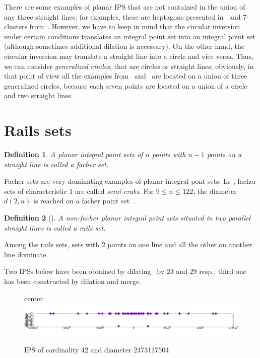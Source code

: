 \documentclass[12pt]{article}
\theoremstyle{theorem}
\theoremstyle{dfn}
\newtheorem{dfn}{Definition}
\theoremstyle{remark}
\begin{document}
There are some examples of planar IPS that are not contained in the union of any three straight lines:
for examples, these are heptagons presented in~\cite{kreisel2008heptagon} and 7-clusters from~\cite{kurz2013constructing}.
However, we have to keep in mind that the circular inversion under certain conditions
translates an integral point set into an integral point set
(although sometimes additional dilation is necessary).
On the other hand, the circular inversion may translate a straight line into a circle and vice versa.
Thus, we can consider \emph{generalized circles}, that are circles or straight lines;
obviously, in that point of view all the examples from~\cite{kreisel2008heptagon} and~\cite{kurz2013constructing}
are located on a union of three generalized circles,
because each seven points are located on a union of a circle and two straight lines.




\section{Rails sets}

\begin{dfn}
	A planar integral point sets of $n$ points with $n-1$ points on a straight line is called
	a \textit{facher} set.
\end{dfn}
Facher sets are very dominating examples of planar integral pont sets.
In~\cite{antonov2008maximal}, facher sets of characteristic 1 are called \textit{semi-crabs}.
For $9 \leq n \leq 122$, the diameter $d(2,n)$ is reached on a facher point set~\cite{kurz2008minimum}.

\begin{dfn}[\cite{avdeev2019particular}]
	A non-facher planar integral point sets situated in two parallel straight lines
	is called a \textit{rails} set.
\end{dfn}

Among the rails sets, sets with 2 points on one line and all the other on another line dominate.


Two IPSs below have been obtained by dilating~\cite[Fig. 34]{avdeev2019particular} by $23$ and $29$  resp.;
third one has been constructed by dilation and merge.



\begin{figure}[h!]
center{\includegraphics[width=1\linewidth]{./img/42_symm.png}}
\parbox{1\linewidth}{\caption{IPS of cardinality 42 and diameter 2473117504}
\label{42_symm.png}}
\end{figure}
\end{document}
